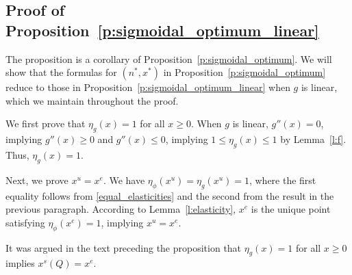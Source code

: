 \documentclass[12pt]{article}
\newcommand{\efficacy}{\phi}
\newcommand{\general}{g}
\newcommand{\xshort}{x^{s}}
\newcommand{\xunit}{x^{e}}
\newcommand{\xun}{x^{u}}
\newcommand{\elasticity}[1]{\eta_{#1}}
\begin{document}

\subsection*{Proof of Proposition~\ref{p:sigmoidal_optimum_linear}}

The proposition is a corollary of Proposition~\ref{p:sigmoidal_optimum}. We will show that the formulas for $(n^*, x^*)$ in Proposition~\ref{p:sigmoidal_optimum} reduce to those in Proposition~\ref{p:sigmoidal_optimum_linear} when $g$ is linear, which we maintain throughout the proof. 

We first prove that $\elasticity{\general}(x) = 1$ for all $x \geq 0$. When $\general$ is linear, $\general''(x) = 0$, implying $\general''(x) \geq 0$ and $\general''(x) \leq 0$, implying $1 \leq \elasticity{\general}(x) \leq 1$ by Lemma~\ref{l:f}. Thus, $\elasticity{\general}(x) = 1$. 

Next, we prove $\xun = \xunit$. We have $\elasticity{\efficacy}(\xun) = \elasticity{\general}(\xun) = 1$, where the first equality follows from \eqref{equal_elasticities} and the second from the result in the previous paragraph. According to Lemma~\ref{l:elasticity}, $\xunit$ is the unique point satisfying $\elasticity{\efficacy}(\xunit) = 1$, implying $\xun = \xunit$. 

It was argued in the text preceding the proposition that $\elasticity{\general}(x) = 1$ for all $x \geq 0$ implies $\xshort(Q) = \xunit$. 
\end{document}
